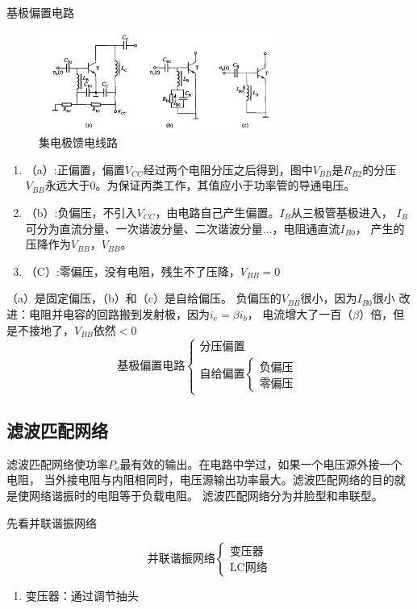 \documentclass[10pt]{article}
\begin{document}
\begin{example}
基极偏置电路
\begin{figure}[H] %
    \centering %
    \includegraphics[width=0.7\textwidth]{pictures/2-4.png} %
    \caption{集电极馈电线路} %
    \label{fig.2-4}%
\end{figure}
\begin{enumerate}
\item （a）:正偏置，偏置$V_{CC}$经过两个电阻分压之后得到，图中$V_{BB}$是$R_{B2}$的分压
$V_{BB}$永远大于0。为保证丙类工作，其值应小于功率管的导通电压。
\item （b）:负偏压，不引入$V_{CC}$，由电路自己产生偏置。$I_{B}$从三极管基极进入，
$I_{B}$可分为直流分量、一次谐波分量、二次谐波分量$\dots$，电阻通直流$I_{B0}$，
产生的压降作为$V_{BB}$，$V_{BB}$。
\item （C）:零偏压，没有电阻，残生不了压降，$V_{BB}  = 0$
\end{enumerate}
\end{example}
（a）是固定偏压，（b）和（c）是自给偏压。
负偏压的$V_{BB}$很小，因为$I_{B0}很小$
改进：电阻并电容的回路搬到发射极，因为$i_e = \beta i_b$，
电流增大了一百（$\beta$）倍，但是不接地了，$V_{BB}$依然$<0$
$$
\text{基极偏置电路}
\left\{  
    \begin{array}{cc}  
        \text{分压偏置}\\  
        \text{自给偏置} \left\{
            \begin{array}{cc}
                \text{负偏压}\\
                \text{零偏压}
            \end{array}
        \right.
    \end{array}  
\right.  
$$

\subsection{滤波匹配网络}
滤波匹配网络使功率$P_o$最有效的输出。在电路中学过，如果一个电压源外接一个电阻，
当外接电阻与内阻相同时，电压源输出功率最大。滤波匹配网络的目的就是使网络谐振时的电阻等于负载电阻。
滤波匹配网络分为并脸型和串联型。
\par 先看并联谐振网络


$$
\text{并联谐振网络}
\left\{  
    \begin{array}{cc}  
        \text{变压器}\\  
        \text{LC网络}
    \end{array}  
\right.  
$$
  \begin{enumerate}
   \item 变压器：通过调节抽头
  \end{enumerate} 
\end{document}
